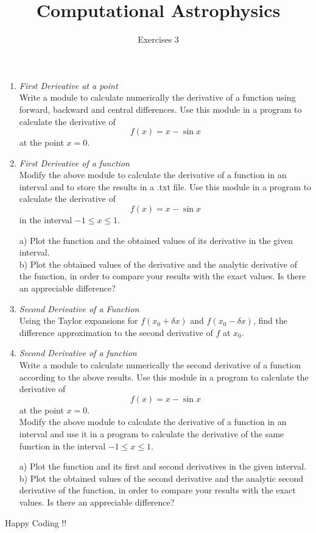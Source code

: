 \documentclass[10pt,letterpaper,notitlepage]{report}
\begin{document}
\title{Computational Astrophysics}
\author{Exercises 3 }
\maketitle

\begin{enumerate}
\item \textit{First Derivative at a point}\\
Write a module to calculate numerically the derivative of a function using forward, backward and central differences. Use this module in a program to calculate the derivative of 
\begin{equation}
f(x) = x - \sin x
\end{equation}
at the point $x = 0$. 

\item \textit{First Derivative of a function}\\
Modify the above module to calculate the derivative of a function in an interval and to store the results in a .txt file. Use this module in a program to  calculate the derivative of 
\begin{equation}
f(x) = x - \sin x
\end{equation}
in the interval $-1 \leq x \leq 1$.

a) Plot the function and the obtained values of its derivative in the given interval.\\
b) Plot the obtained values of the derivative and the analytic derivative of the function, in order to compare your results with the exact values. Is there an appreciable difference?

\item  \textit{Second Derivative of a Function} \\
Using the Taylor expansions for $f(x_0 +\delta x)$ and $f(x_0 - \delta x)$, find the difference approximation to the second derivative of $f$ at $x_0$.


\item \textit{Second Derivative of a function}\\
Write a module to calculate numerically the second derivative of a function according to the above results. Use this module in a program to calculate the derivative of 
\begin{equation}
f(x) = x - \sin x
\end{equation}
at the point $x=0$.\\
Modify the above module to calculate the derivative of a function in an interval and use it in a program to calculate the derivative of the same function in the interval $-1 \leq x \leq 1$.


a) Plot the function and its first and second derivatives in the given interval.\\
b) Plot the obtained values of the second derivative and the analytic second derivative of the function, in order to compare your results with the exact values. Is there an appreciable difference?



\end{enumerate}

Happy Coding !!
\end{document}
